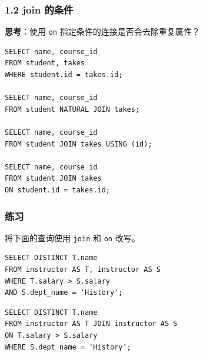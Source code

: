 \documentclass[aspectratio=169, 14pt]{beamer}
\begin{document}
\begin{frame}[fragile]
    \frametitle{1.2 join 的条件}


\textbf{思考}：使用 \texttt{on} 指定条件的连接是否会去除重复属性？

\end{frame}

\begin{frame}[fragile]
    \begin{verbatim}
SELECT name, course_id
FROM student, takes
WHERE student.id = takes.id;

SELECT name, course_id
FROM student NATURAL JOIN takes;

SELECT name, course_id
FROM student JOIN takes USING (id);

SELECT name, course_id
FROM student JOIN takes
ON student.id = takes.id;
    \end{verbatim}

\end{frame}

\begin{frame}[fragile]
    \frametitle{练习}

将下面的查询使用 \texttt{join} 和 \texttt{on} 改写。

\begin{verbatim}
SELECT DISTINCT T.name
FROM instructor AS T, instructor AS S
WHERE T.salary > S.salary
AND S.dept_name = 'History';    
\end{verbatim}

\pause

\begin{verbatim}
SELECT DISTINCT T.name
FROM instructor AS T JOIN instructor AS S
ON T.salary > S.salary
WHERE S.dept_name = 'History';   
\end{verbatim}

\end{frame}
\end{document}
